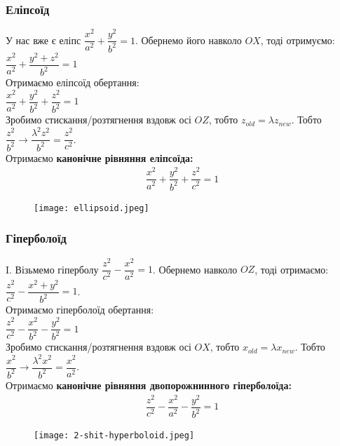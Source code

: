 \documentclass[a4paper, 10pt]{extarticle}
\theoremstyle{theoremdd}
\theoremstyle{theoremdd}
\theoremstyle{theoremdd}
\theoremstyle{theoremdd}
\theoremstyle{theoremdd}
\theoremstyle{theoremdd}
\theoremstyle{theoremdd}
\theoremstyle{theoremdd}
\begin{document}
\subsubsection{Еліпсоїд}
У нас вже є еліпс $\dfrac{x^2}{a^2} + \dfrac{y^2}{b^2} = 1$. Обернемо його навколо $OX$, тоді отримуємо:\\
$\dfrac{x^2}{a^2} + \dfrac{y^2+z^2}{b^2} = 1$\\
Отримаємо еліпсоїд обертання:\\
$\dfrac{x^2}{a^2} + \dfrac{y^2}{b^2} + \dfrac{z^2}{b^2} = 1$\\
Зробимо стискання/розтягнення вздовж осі $OZ$, тобто $z_{old} = \lambda z_{new}$. Тобто $\dfrac{z^2}{b^2} \to \dfrac{\lambda^2 z^2}{b^2} = \dfrac{z^2}{c^2}$.\\
Отримаємо \textbf{канонічне рівняння еліпсоїда:}
\begin{align*}
\dfrac{x^2}{a^2} + \dfrac{y^2}{b^2} + \dfrac{z^2}{c^2} = 1
\end{align*}
\begin{figure}[H]
\centering
\texttt{[image: ellipsoid.jpeg]}
\end{figure}
%

\subsubsection{Гіперболоїд}
I. Візьмемо гіперболу $\dfrac{z^2}{c^2} - \dfrac{x^2}{a^2} = 1$. Обернемо навколо $OZ$, тоді отримаємо:\\
$\dfrac{z^2}{c^2} - \dfrac{x^2+y^2}{b^2} = 1$.\\
Отримаємо гіперболоїд обертання:\\
$\dfrac{z^2}{c^2} - \dfrac{x^2}{b^2} - \dfrac{y^2}{b^2} = 1$\\
Зробимо стискання/розтягнення вздовж осі $OX$, тобто $x_{old} = \lambda x_{new}$. Тобто $\dfrac{x^2}{b^2} \to \dfrac{\lambda^2 x^2}{b^2} = \dfrac{x^2}{a^2}$.\\
Отримаємо \textbf{канонічне рівняння двопорожнинного гіперболоїда:}
\begin{align*}
\dfrac{z^2}{c^2} - \dfrac{x^2}{a^2} - \dfrac{y^2}{b^2} = 1
\end{align*}
\begin{figure}[H]
\centering
\texttt{[image: 2-shit-hyperboloid.jpeg]}
\end{figure}
\end{document}
